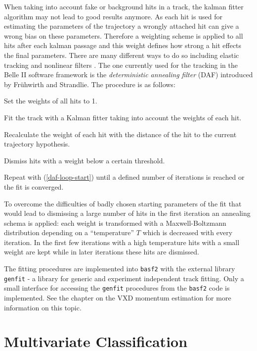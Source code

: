 When taking into account fake or background hits in a track, the kalman fitter algorithm may not lead to good results anymore. As each hit is used for estimating the parameters of the trajectory a wrongly attached hit can give a wrong bias on these parameters. Therefore a weighting scheme is applied to all hits after each kalman passage and this weight defines how strong a hit effects the final parameters. There are many different ways to do so including elastic tracking and nonlinear filters \cite{daf_fruh}. The one currently used for the tracking in the Belle II software framework is the \emph{deterministic annealing filter} (DAF) introduced by Frühwirth and Strandlie. The procedure is as follows:
\begin{zlist}
  \item Set the weights of all hits to 1.
  \item Fit the track with a Kalman fitter taking into account the weights of each hit. \label{daf-loop-start}
  \item Recalculate the weight of each hit with the distance of the hit to the current trajectory hypothesis.
  \item Dismiss hits with a weight below a certain threshold.
  \item Repeat with (\ref{daf-loop-start}) until a defined number of iterations is reached or the fit is converged.
\end{zlist}

To overcome the difficulties of badly chosen starting parameters of the fit that would lead to dismissing a large number of hits in the first iteration an annealing schema is applied: each weight is transformed with a Maxwell-Boltzmann distribution depending on a ``temperature'' $T$ which is decreased with every iteration. In the first few iterations with a high temperature hits with a small weight are kept while in later iterations these hits are dismissed.

The fitting procedures are implemented into \texttt{basf2} with the external library \texttt{genfit} \cite{genfit} - a library for generic and experiment independent track fitting. Only a small interface for accessing the \texttt{genfit} procedures from the \texttt{basf2} code is implemented. See the chapter on the VXD momentum estimation for more information on this topic.

\section{Multivariate Classification}

